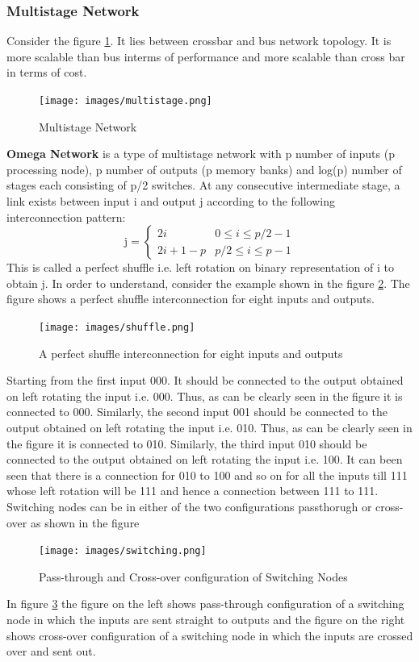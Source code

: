 \documentclass[12pt]{article}
\begin{document}
\subsubsection{Multistage Network}
Consider the figure \ref{fig:multistage}. It lies between crossbar and bus network topology.
It is more scalable than bus interms of performance and more scalable than cross bar in terms of cost.
\begin{figure}[H]
    \centering
    \texttt{[image: images/multistage.png]}
    \caption{Multistage Network}
    \label{fig:multistage}
\end{figure}
\textbf{Omega Network} is a type of multistage network with p number of inputs (p processing node), 
p number of outputs (p memory banks) and log(p) number of stages each consisting of p/2 switches. At any consecutive intermediate stage, 
a link exists between input i and output j according to the following interconnection pattern:
\begin{equation}
    \text{j} = 
    \begin{cases}
        2i & 0\leq i\leq p/2-1 \\
        2i+1-p & p/2\leq i\leq p-1
    \end{cases}
\end{equation}
This is called a perfect shuffle i.e. left rotation on binary representation of i to obtain j.
In order to understand, consider the example shown in the figure \ref{fig:shuffle}. The figure shows a perfect shuffle interconnection for eight inputs and outputs.
\begin{figure}[H]
    \centering
    \texttt{[image: images/shuffle.png]}
    \caption{A perfect shuffle interconnection for eight inputs and outputs}
    \label{fig:shuffle}
\end{figure}
Starting from the first input 000. It should be connected to the output obtained on left rotating the input i.e. 000. 
Thus, as can be clearly seen in the figure it is connected to 000. Similarly, the second input 001 should be connected to the output obtained on left rotating the input i.e. 010.
Thus, as can be clearly seen in the figure it is connected to 010. Similarly, the third input 010 should be connected to the output obtained on left rotating the input i.e. 100. 
It can been seen that there is a connection for 010 to 100 and so on for all the inputs till 111 whose left rotation will be 111 and hence a connection between 111 to 111.
Switching nodes can be in either of the two configurations passthorugh or cross-over as shown in the figure 
\begin{figure}[H]
    \centering
    \texttt{[image: images/switching.png]}
    \caption{Pass-through and Cross-over configuration of Switching Nodes}
    \label{fig:switching}
\end{figure}
In figure \ref{fig:switching} the figure on the left shows pass-through configuration of a switching node in which the inputs are sent straight to outputs
and the figure on the right shows cross-over configuration of a switching node in which the inputs are crossed over and sent out.
\end{document}
